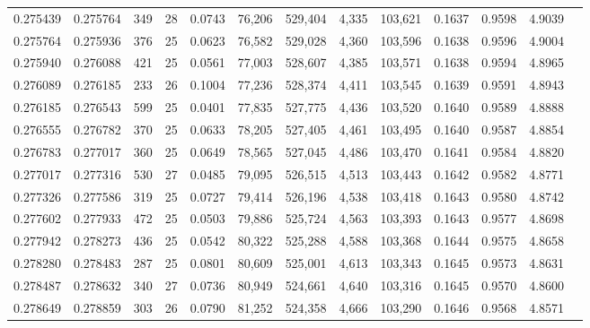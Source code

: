 \begin{tabular}{rrrrrrrrrrrrr}
0.275439 & 0.275764 & 349 &  28 &                                     0.0743 &  76,206 & 529,404 &   4,335 & 103,621 & 0.1637 & 0.9598 & 4.9039 \\
0.275764 & 0.275936 & 376 &  25 &                                     0.0623 &  76,582 & 529,028 &   4,360 & 103,596 & 0.1638 & 0.9596 & 4.9004 \\
0.275940 & 0.276088 & 421 &  25 &                                     0.0561 &  77,003 & 528,607 &   4,385 & 103,571 & 0.1638 & 0.9594 & 4.8965 \\
0.276089 & 0.276185 & 233 &  26 &                                     0.1004 &  77,236 & 528,374 &   4,411 & 103,545 & 0.1639 & 0.9591 & 4.8943 \\
0.276185 & 0.276543 & 599 &  25 &                                     0.0401 &  77,835 & 527,775 &   4,436 & 103,520 & 0.1640 & 0.9589 & 4.8888 \\
0.276555 & 0.276782 & 370 &  25 &                                     0.0633 &  78,205 & 527,405 &   4,461 & 103,495 & 0.1640 & 0.9587 & 4.8854 \\
0.276783 & 0.277017 & 360 &  25 &                                     0.0649 &  78,565 & 527,045 &   4,486 & 103,470 & 0.1641 & 0.9584 & 4.8820 \\
0.277017 & 0.277316 & 530 &  27 &                                     0.0485 &  79,095 & 526,515 &   4,513 & 103,443 & 0.1642 & 0.9582 & 4.8771 \\
0.277326 & 0.277586 & 319 &  25 &                                     0.0727 &  79,414 & 526,196 &   4,538 & 103,418 & 0.1643 & 0.9580 & 4.8742 \\
0.277602 & 0.277933 & 472 &  25 &                                     0.0503 &  79,886 & 525,724 &   4,563 & 103,393 & 0.1643 & 0.9577 & 4.8698 \\
0.277942 & 0.278273 & 436 &  25 &                                     0.0542 &  80,322 & 525,288 &   4,588 & 103,368 & 0.1644 & 0.9575 & 4.8658 \\
0.278280 & 0.278483 & 287 &  25 &                                     0.0801 &  80,609 & 525,001 &   4,613 & 103,343 & 0.1645 & 0.9573 & 4.8631 \\
0.278487 & 0.278632 & 340 &  27 &                                     0.0736 &  80,949 & 524,661 &   4,640 & 103,316 & 0.1645 & 0.9570 & 4.8600 \\
0.278649 & 0.278859 & 303 &  26 &                                     0.0790 &  81,252 & 524,358 &   4,666 & 103,290 & 0.1646 & 0.9568 & 4.8571 \\

\end{tabular}
